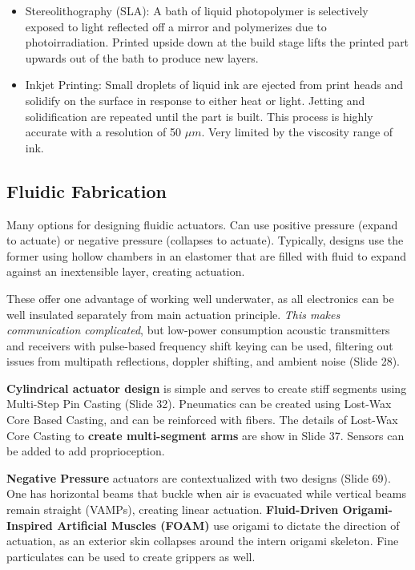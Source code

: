 \documentclass[onecolumn,a4paper]{article}
\begin{document}
\begin{itemize}
\begin{itemize}
        \item Stereolithography (SLA): A bath of liquid photopolymer is selectively exposed to light reflected off a mirror and polymerizes due to photoirradiation. Printed upside down at the build stage lifts the printed part upwards out of the bath to produce new layers.
        \item Inkjet Printing: Small droplets of liquid ink are ejected from print heads and solidify on the surface in response to either heat or light. Jetting and solidification are repeated until the part is built. This process is highly accurate with a resolution of 50 $\mu m$. Very limited by the viscosity range of ink.
    \end{itemize}
\end{itemize}

\subsection{Fluidic Fabrication}

Many options for designing fluidic actuators. Can use positive pressure (expand to actuate) or negative pressure (collapses to actuate). Typically, designs use the former using hollow chambers in an elastomer that are filled with fluid to expand against an inextensible layer, creating actuation.

These offer one advantage of working well underwater, as all electronics can be well insulated separately from main actuation principle. \emph{This makes communication complicated}, but low-power consumption acoustic transmitters and receivers with pulse-based frequency shift keying can be used, filtering out issues from multipath reflections, doppler shifting, and ambient noise (Slide 28).

\textbf{Cylindrical actuator design} is simple and serves to create stiff segments using Multi-Step Pin Casting (Slide 32). Pneumatics can be created using Lost-Wax Core Based Casting, and can be reinforced with fibers. The details of Lost-Wax Core Casting to \textbf{create multi-segment arms} are show in Slide 37. Sensors can be added to add proprioception.

\textbf{Negative Pressure} actuators are contextualized with two designs (Slide 69). One has horizontal beams that buckle when air is evacuated while vertical beams remain straight (VAMPs), creating linear actuation. \textbf{Fluid-Driven Origami-Inspired Artificial Muscles (FOAM)} use origami to dictate the direction of actuation, as an exterior skin collapses around the intern origami skeleton. Fine particulates can be used to create grippers as well.
\end{document}
